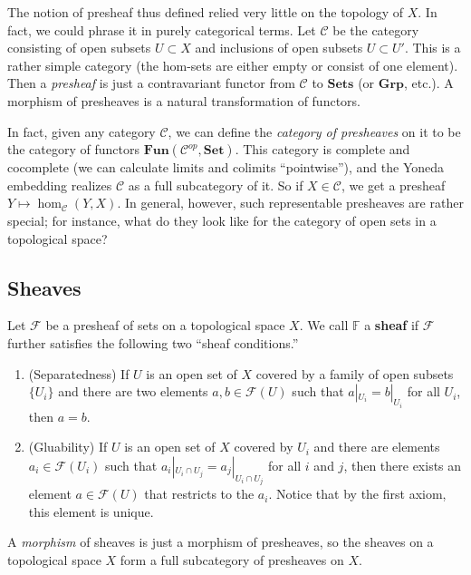 \begin{remark} 
The notion of presheaf thus defined relied very little on the topology of $X$. 
In fact, we could phrase it in purely categorical terms. Let $\mathcal{C}$ be
the category consisting of open subsets $U \subset X$ and inclusions of open
subsets $U
\subset U'$. This is a rather simple category (the hom-sets are either empty
or consist of one element). Then a \emph{presheaf} is just a contravariant
functor from $\mathcal{C}$ to $\mathbf{Sets}$ (or $\mathbf{Grp}$, etc.). A
morphism of presheaves is a natural transformation of functors.

In fact, given any category $\mathcal{C}$, we can define the \emph{category of
presheaves} on it to be the category of functors $\mathbf{Fun}(\mathcal{C}^{op}, \mathbf{Set})$.
This category is complete and cocomplete (we can calculate limits and colimits
``pointwise''), and the Yoneda embedding realizes $\mathcal{C}$ as a full
subcategory of it. So if $X \in \mathcal{C}$, we get a presheaf $Y \mapsto
\hom_{\mathcal{C}}(Y, X)$. In general, however, such representable presheaves
are rather special; for instance, what do they look like for the category of
open sets in a topological space?
\end{remark} 

\subsection{Sheaves}

\begin{definition} Let $\mathcal{F}$ be a presheaf of sets
 on a topological space $X$. We call $\mathbb{F}$ a
\textbf{sheaf} if $\mathcal{F}$ further satisfies the following two
``sheaf conditions.''
\begin{enumerate}
\item(Separatedness) {If $U$ is an open set of $X$ covered by a family of open subsets $\{U_i\}$ and there
are two elements $a,b\in \mathcal{F}(U)$ such that
$a|_{U_i}=b|_{U_i}$ for all $U_i$, then $a=b$.}
\item(Gluability) {If $U$ is an open set of $X$ covered by $U_i$ and there
are elements $a_i\in \mathcal{F}(U_i)$ such that $a_i|_{U_i\cap
U_j} = a_j|_{U_i\cap U_j}$ for all $i$ and $j$, then there
exists an element $a\in\mathcal{F}(U)$ that restricts to the
$a_i$. Notice that by the first axiom, this element is unique.}
\end{enumerate}
A \emph{morphism} of sheaves is just a morphism of presheaves, so the sheaves
on a topological space $X$ form a
full subcategory of presheaves on $X$.
\end{definition}


